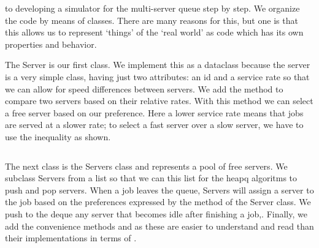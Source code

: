 \documentclass[queueing-book.tex]{subfiles}
\begin{document}






 to developing a simulator for the multi-server queue step by step. We organize the code by means of classes. There are many reasons for this, but one is that this allows us to represent `things' of the `real world' as code which has its own properties and behavior.

The Server is our first class.
We implement this as a dataclass because the server is a very simple class, having just two attributes: an id and a service rate so that we can allow for speed differences between servers.
We add the method  to compare two servers based on their relative rates.
With this method we can select a free server based on our preference. Here a lower service rate means that jobs are served at a slower rate; to select a fast server over a slow server, we have to use the inequality as shown.
\inputminted[label=server.py]{python}{../code/event_stacks/server.py}


The next class is the Servers class and represents a pool of free servers.
We subclass Servers from a list so that we can this list for the heapq algoritms to push and pop servers.
When a job leaves the queue, Servers will assign a server to the job based on the preferences expressed by the  method of the Server class.
We push to the deque any server that becomes idle after finishing a job,.
Finally, we add the convenience methods  and  as these are easier to understand and read than their implementations in terms of .
\inputminted[label=servers.py]{python}{../code/event_stacks/servers.py}
\end{document}

